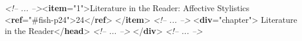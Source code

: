 \begin{shaded}
\textit{<!-- ... -->}{<\textbf{item}\hspace*{1em}{n}="{1}">}Literature in the Reader: Affective Stylistics\mbox{}\newline 
{<\textbf{ref}\hspace*{1em}{target}="{\#fish-p24}">}24{</\textbf{ref}>}\mbox{}\newline 
{</\textbf{item}>}\mbox{}\newline 
\textit{<!-- ... -->}\mbox{}\newline 
{<\textbf{div}\hspace*{1em}{type}="{chapter}">}\mbox{}\newline 
{}Literature in the Reader{</\textbf{head}>}\mbox{}\newline 
{}\mbox{}\newline 
\textit{<!-- ... -->}\mbox{}\newline 
{</\textbf{div}>}\mbox{}\newline 
\textit{<!-- ... -->}\end{shaded}\egroup\par \par
